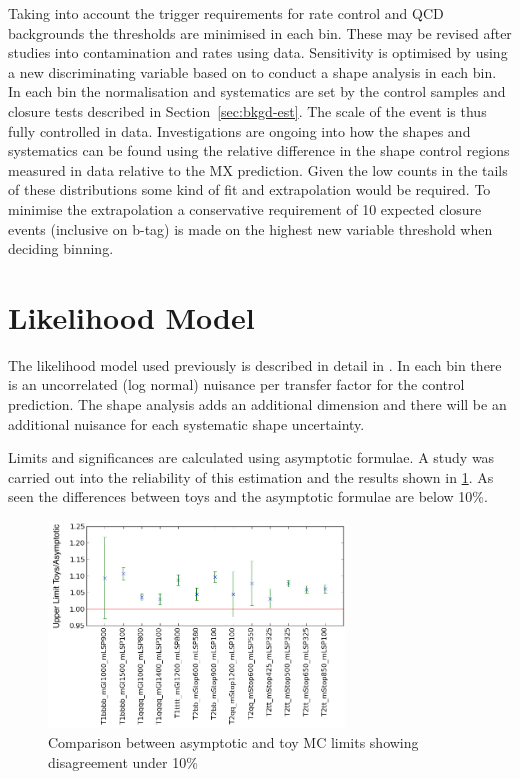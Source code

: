 Taking into account the trigger requirements for rate control and QCD 
backgrounds the \alphat thresholds are minimised in each 
bin. These may be revised after studies into contamination and rates using data. 
Sensitivity is optimised by using a new discriminating variable based on \mht to 
conduct a shape analysis in each \scalhtcat bin. 
In each \scalhtcat bin the normalisation and systematics 
are set by the control samples
and closure tests described in Section~\ref{sec:bkgd-est}. The scale of the event is
thus fully controlled in data. Investigations are 
ongoing into how the shapes 
and systematics can be found using the relative difference in the shape 
control regions measured in data relative to the MX prediction. Given the low
counts in the tails of these distributions some kind of fit and extrapolation 
would be required. To minimise the extrapolation a 
conservative requirement of 10 expected closure events (inclusive on b-tag) is 
made on the highest new variable threshold when deciding binning. 

\section{Likelihood Model}

The likelihood model used previously is described in 
detail in \cite{CMSAT8}. 
In each \scalhtcat bin there is an uncorrelated (log 
normal) nuisance per transfer factor for the control 
prediction. The shape analysis adds an additional 
dimension and there will be an additional nuisance for each systematic shape uncertainty.

Limits and significances are calculated using asymptotic 
formulae\cite{asymp}. 
A study was carried out into the reliability of this 
estimation and the results shown in \ref{fig:asympToys}. 
As seen the differences between toys and the 
asymptotic formulae are below 10\%.

\begin{figure}
  \centering
     \includegraphics[width=0.7\textwidth]{Figures/asympToys.png}
  \caption{Comparison between asymptotic and toy MC limits showing disagreement under 10\%}
  \label{fig:asympToys}
\end{figure}

